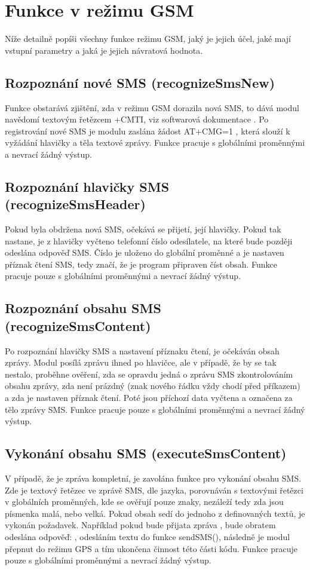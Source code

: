 \documentclass[FM,MP]{tulthesis}  %
\begin{document}

\section{Funkce v režimu GSM}
Níže detailně popíši všechny funkce režimu GSM, jaký je jejich účel, jaké mají vstupní parametry a jaká je jejich návratová hodnota.

\subsection{Rozpoznání nové SMS (recognizeSmsNew)}
Funkce obstarává zjištění, zda v režimu GSM dorazila nová SMS, to dává modul navědomí textovým řetězcem +CMTI, viz softwarová dokumentace \cite{SIMCOM SW}. Po registrování nové SMS je modulu zaslána žádost AT+CMG=1 \cite{SIMCOM SW}, která slouží k vyžádání hlavičky a těla textové zprávy. Funkce pracuje s globálními proměnnými a nevrací žádný výstup.

\subsection{Rozpoznání hlavičky SMS (recognizeSmsHeader)}
Pokud byla obdržena nová SMS, očekává se přijetí, její hlavičky. Pokud tak nastane, je z hlavičky vyčteno telefonní číslo odesílatele, na které bude později odeslána odpověď SMS. Číslo je uloženo do globální proměnné a je nastaven příznak čtení SMS, tedy značí, že je program připraven číst obsah. Funkce pracuje pouze s globálními proměnnými a nevrací žádný výstup.

\subsection{Rozpoznání obsahu SMS (recognizeSmsContent)}
Po rozpoznání hlavičky SMS a nastavení příznaku čtení, je očekáván obsah zprávy. Modul posílá zprávu ihned po hlavičce, ale v případě, že by se tak nestalo, proběhne ověření, zda se opravdu jedná o zprávu SMS zkontrolováním obsahu zprávy, zda není prázdný (znak nového řádku vždy chodí před příkazem) a zda je nastaven příznak čtení. Poté jsou příchozí data vyčtena a označena za tělo zprávy SMS. Funkce pracuje pouze s globálními proměnnými a nevrací žádný výstup.

\subsection{Vykonání obsahu SMS (executeSmsContent)}
V případě, že je zpráva kompletní, je zavolána funkce pro vykonání obsahu SMS. Zde je textový řetězec ve zprávě SMS, dle jazyka, porovnáván s textovými řetězci v globálních proměnných, kde se ověřují pouze znaky, nezáleží tedy zda jsou písmenka malá, nebo velká. Pokud obsah sedí do jednoho z definovaných textů, je vykonán požadavek. Například pokud bude přijata zpráva , bude obratem odeslána odpověď: , odesláním textu do funkce sendSMS(), následně je modul přepnut do režimu GPS a tím ukončena činnost této části kódu. Funkce pracuje pouze s globálními proměnnými a nevrací žádný výstup.
\end{document}

